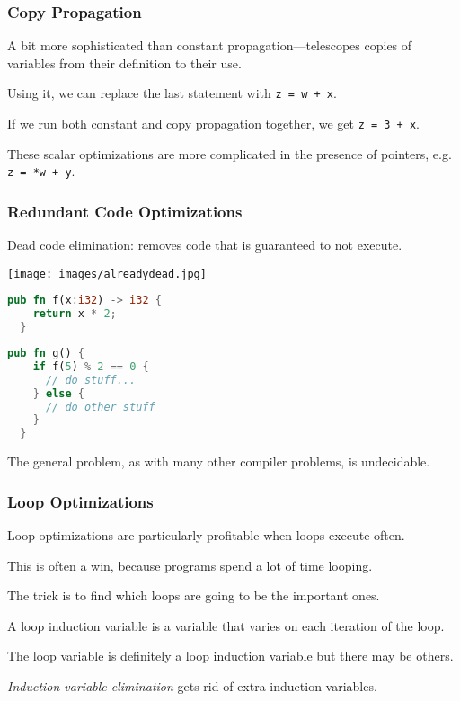 \begin{frame}
\frametitle{Copy Propagation}

A bit more sophisticated than constant
propagation---telescopes copies of variables from their definition to
their use. 

Using it, we can replace the
last statement with {\tt z = w + x}. 

If we run both constant and copy
propagation together, we get {\tt z = 3 + x}.

These scalar optimizations are more complicated in the presence
of pointers, e.g. {\tt z = *w + y}.

\end{frame}


\begin{frame}[fragile]
\frametitle{Redundant Code Optimizations}

Dead code elimination: removes code that is guaranteed to not execute.

\begin{center}
	\texttt{[image: images/alreadydead.jpg]}
\end{center}

{\scriptsize
\begin{center}
\vspace*{-2em}
\begin{minipage}{.3\textwidth}
\begin{lstlisting}[language=Rust]
  pub fn f(x:i32) -> i32 {
    return x * 2;
  }
  \end{lstlisting}
  \end{minipage} \begin{minipage}{.3\textwidth}
\begin{lstlisting}[language=Rust]
  pub fn g() {
    if f(5) % 2 == 0 {
      // do stuff...
    } else {
      // do other stuff
    }
  }
\end{lstlisting}
\end{minipage}
\end{center}
}

The general problem, as with many other compiler problems, is undecidable.


\end{frame}


\begin{frame}
\frametitle{Loop Optimizations}

Loop optimizations are particularly profitable when loops execute
often. 

This is often a win, because programs spend a lot of time looping.


The trick is to find which loops are going to be the important ones.

A loop induction variable is a variable that varies on each iteration
of the loop. 

The loop variable is definitely a loop induction variable
but there may be others. 

\emph{Induction variable elimination} gets
rid of extra induction variables.



\end{frame}

